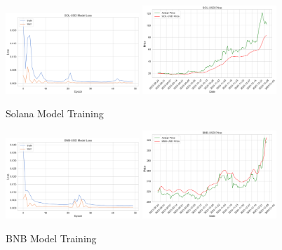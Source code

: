 \documentclass{ledger}
\begin{document}
\begin{figure}[htbp]
    \centering
    \includegraphics[width=0.45\textwidth]{code/price-prediction/lstm/images/sol_usd_loss.png} %
    \hspace{0.05\textwidth} %
    \includegraphics[width=0.45\textwidth]{code/price-prediction/lstm/images/sol_usd_price.png} %
    \caption{Solana Model Training}
    \label{fig:side_by_side}
\end{figure}

\begin{figure}[htbp]
    \centering
    \includegraphics[width=0.45\textwidth]{code/price-prediction/lstm/images/bnb_usd_loss.png} %
    \hspace{0.05\textwidth} %
    \includegraphics[width=0.45\textwidth]{code/price-prediction/lstm/images/bnb_usd_price.png} %
    \caption{BNB Model Training}
    \label{fig:side_by_side}
\end{figure}
\end{document}
